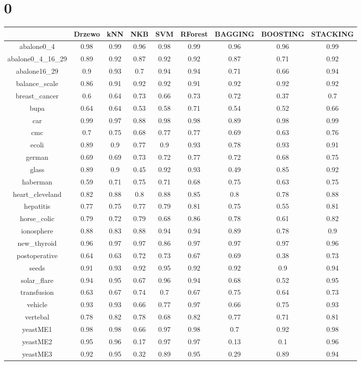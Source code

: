 \documentclass{article}%
\begin{document}
%
\normalsize%
\section*{0}%
\begin{tabular}{|c|c|c|c|c|c|c|c|c|}%
\hline%
&Drzewo&kNN&NKB&SVM&RForest&BAGGING&BOOSTING&STACKING\\%
\hline%
abalone0\_4&0.98&0.99&0.96&0.98&0.99&0.96&0.96&0.99\\%
\hline%
abalone0\_4\_16\_29&0.89&0.92&0.87&0.92&0.92&0.87&0.71&0.92\\%
\hline%
abalone16\_29&0.9&0.93&0.7&0.94&0.94&0.71&0.66&0.94\\%
\hline%
balance\_scale&0.86&0.91&0.92&0.92&0.91&0.92&0.92&0.92\\%
\hline%
breast\_cancer&0.6&0.64&0.73&0.66&0.73&0.72&0.37&0.7\\%
\hline%
bupa&0.64&0.64&0.53&0.58&0.71&0.54&0.52&0.66\\%
\hline%
car&0.99&0.97&0.88&0.98&0.98&0.89&0.98&0.99\\%
\hline%
cmc&0.7&0.75&0.68&0.77&0.77&0.69&0.63&0.76\\%
\hline%
ecoli&0.89&0.9&0.77&0.9&0.93&0.78&0.93&0.91\\%
\hline%
german&0.69&0.69&0.73&0.72&0.77&0.72&0.68&0.75\\%
\hline%
glass&0.89&0.9&0.45&0.92&0.93&0.49&0.85&0.92\\%
\hline%
haberman&0.59&0.71&0.75&0.71&0.68&0.75&0.63&0.75\\%
\hline%
heart\_cleveland&0.82&0.88&0.8&0.88&0.85&0.8&0.78&0.88\\%
\hline%
hepatitis&0.77&0.75&0.77&0.79&0.81&0.75&0.55&0.81\\%
\hline%
horse\_colic&0.79&0.72&0.79&0.68&0.86&0.78&0.61&0.82\\%
\hline%
ionosphere&0.88&0.83&0.88&0.94&0.94&0.89&0.78&0.9\\%
\hline%
new\_thyroid&0.96&0.97&0.97&0.86&0.97&0.97&0.97&0.96\\%
\hline%
postoperative&0.64&0.63&0.72&0.73&0.67&0.69&0.38&0.73\\%
\hline%
seeds&0.91&0.93&0.92&0.95&0.92&0.92&0.9&0.94\\%
\hline%
solar\_flare&0.94&0.95&0.67&0.96&0.94&0.68&0.52&0.95\\%
\hline%
transfusion&0.63&0.67&0.74&0.7&0.67&0.75&0.64&0.73\\%
\hline%
vehicle&0.93&0.93&0.66&0.77&0.97&0.66&0.75&0.93\\%
\hline%
vertebal&0.78&0.82&0.78&0.68&0.82&0.77&0.71&0.81\\%
\hline%
yeastME1&0.98&0.98&0.66&0.97&0.98&0.7&0.92&0.98\\%
\hline%
yeastME2&0.95&0.96&0.17&0.97&0.97&0.13&0.1&0.96\\%
\hline%
yeastME3&0.92&0.95&0.32&0.89&0.95&0.29&0.89&0.94\\%
\hline%
\end{tabular}
\end{document}

